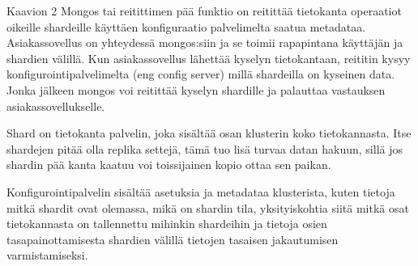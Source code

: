 

Kaavion 2 Mongos tai reitittimen pää funktio on reitittää tietokanta operaatiot oikeille shardeille käyttäen konfiguraatio palvelimelta saatua metadataa.
Asiakassovellus on yhteydessä mongos:siin ja se toimii rapapintana käyttäjän ja shardien välillä. 
Kun asiakassovellus lähettää kyselyn tietokantaan, reititin kysyy konfigurointipalvelimelta (eng config server) millä shardeilla on kyseinen data. 
Jonka jälkeen mongos voi reitittää kyselyn shardille ja palauttaa vastauksen asiakassovellukselle.
\medskip

Shard on tietokanta palvelin, joka sisältää osan klusterin koko tietokannasta.
Itse shardejen pitää olla replika settejä, 
tämä tuo lisä turvaa datan hakuun, sillä jos shardin pää kanta kaatuu voi toissijainen kopio ottaa sen paikan. 
\medskip



Konfigurointipalvelin sisältää asetuksia ja metadataa klusterista, 
kuten tietoja mitkä shardit ovat olemassa, mikä on shardin tila,
yksityiskohtia siitä mitkä osat tietokannasta on tallennettu mihinkin shardeihin
ja tietoja osien tasapainottamisesta shardien välillä tietojen tasaisen jakautumisen varmistamiseksi.



% 
\iffalse
\subsubsection{Nosql Dokumentti}


jotain nosql yleisesti, jotain dokumentti vs sql
jotain dokumenteista yleisesti

\medskip

NoSql tietokannoilla on monta tapaa säilyttää dataa, jotain relatiivisesta kannasta. 

dokumentti pohjainen tietokanta, jota mongodb käyttää, tallettaa tiedot jossain avain arvo tiedosto formaatissa kuten xml, yaml ja json. \citemissing
\medskip


MongoDB tallettaa tiedont BSON muodossa, joka on binaari edustus JSON formaatista.\labcite{mongodb24a}
tietokannasta dokumentteja voi hakea niiden uniikkien tunnisteiden tai sisällön arvojen perusteella
\medskip
\fi


















